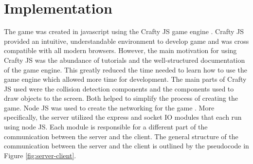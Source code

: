 \section{Implementation}



The game was created in javascript using the Crafty JS game engine
\cite{craftyJS}. Crafty JS provided an intuitive, understandable
environment to develop game and was cross compatible with all modern
browsers. However, the main motivation for using Crafty JS was the
abundance of tutorials and the well-structured documentation of the
game engine. This greatly reduced the time needed to learn how to use
the game engine which allowed more time for development.  The main
parts of Crafty JS used were the collision detection components and
the components used to draw objects to the screen. Both helped to
simplify the process of creating the game.  Node JS was used to create
the networking for the game \cite{nodeJS}. More specifically, the
server utilized the express and socket IO modules that each run using
node JS. Each module is responsible for a different part of the
communication between the server and the client. The general structure
of the communication between the server and the client is outlined by
the pseudocode in Figure \ref{fig:server-client}.


